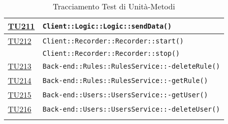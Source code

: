 \begin{longtable}{|>{\centering}m{1cm}|m{12cm}<{\centering}|}
\hyperlink{TU211}{TU211} & \texttt{Client::Logic::Logic::sendData()}\\ \hline

\hyperlink{TU212}{TU212} & \texttt{Client::Recorder::Recorder::start()}\\ & \texttt{Client::Recorder::Recorder::stop()}\\ \hline

\hyperlink{TU213}{TU213} & \texttt{Back-end::Rules::RulesService::-\linebreak deleteRule()}\\ \hline

\hyperlink{TU214}{TU214} & \texttt{Back-end::Rules::RulesService::-\linebreak getRule()}\\ \hline

\hyperlink{TU215}{TU215} & \texttt{Back-end::Users::UsersService::-\linebreak getUser()}\\ \hline

\hyperlink{TU216}{TU216} & \texttt{Back-end::Users::UsersService::-\linebreak deleteUser()}\\ \hline

\caption[Tracciamento Test di Unità-Metodi]{Tracciamento Test di Unità-Metodi}
\label{tabella:tu-met}
\end{longtable}
\clearpage
